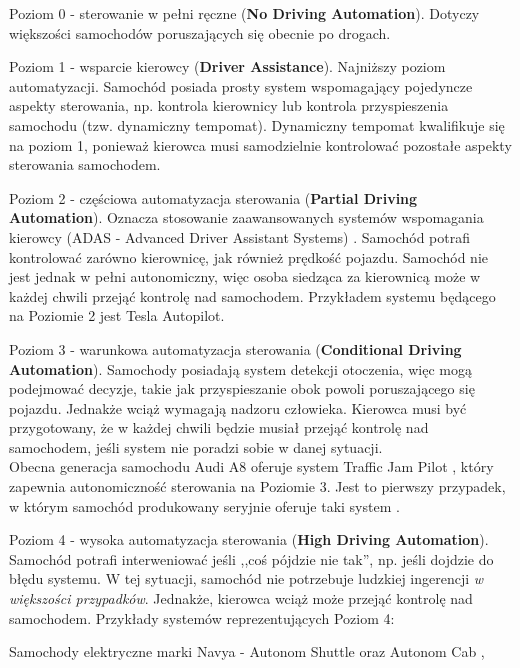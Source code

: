 \begin{enumerate*}
\item Poziom 0 - sterowanie w pełni ręczne (\textbf{No Driving Automation}). Dotyczy większości samochodów poruszających się obecnie po drogach.
\item Poziom 1 - wsparcie kierowcy (\textbf{Driver Assistance}). Najniższy poziom automatyzacji. Samochód posiada prosty system wspomagający pojedyncze aspekty sterowania, np. kontrola kierownicy lub kontrola przyspieszenia samochodu (tzw. dynamiczny tempomat). 
Dynamiczny tempomat kwalifikuje się na poziom 1, ponieważ kierowca musi samodzielnie kontrolować pozostałe aspekty sterowania samochodem.
\item Poziom 2 - częściowa automatyzacja sterowania (\textbf{Partial Driving Automation}). Oznacza stosowanie zaawansowanych systemów wspomagania kierowcy (ADAS - Advanced Driver Assistant Systems) \cite{adas:opis}. Samochód potrafi kontrolować zarówno kierownicę, jak również prędkość pojazdu. Samochód nie jest jednak w pełni autonomiczny, więc osoba siedząca za kierownicą może w każdej chwili przejąć kontrolę nad samochodem. Przykładem systemu będącego na Poziomie 2 jest Tesla Autopilot.
\item Poziom 3 - warunkowa automatyzacja sterowania (\textbf{Conditional Driving Automation}). Samochody posiadają system detekcji otoczenia, więc mogą podejmować decyzje, takie jak przyspieszanie obok powoli poruszającego się pojazdu. Jednakże wciąż wymagają nadzoru człowieka. Kierowca musi być przygotowany, że w każdej chwili będzie musiał przejąć kontrolę nad samochodem, jeśli system nie poradzi sobie w danej sytuacji. \\
Obecna generacja samochodu Audi A8 oferuje system Traffic Jam Pilot \cite{audi:trafficJamPilot}, który zapewnia autonomiczność sterowania na Poziomie 3. Jest to pierwszy przypadek, w którym samochód produkowany seryjnie oferuje taki system \cite{audi:newAudiA8ConditionalAutomated}.
\item Poziom 4 - wysoka automatyzacja sterowania (\textbf{High Driving Automation}). Samochód potrafi interweniować jeśli ,,coś pójdzie nie tak'', np. jeśli dojdzie do błędu systemu. W tej sytuacji, samochód nie potrzebuje ludzkiej ingerencji \textit{w większości przypadków}. Jednakże, kierowca wciąż może przejąć kontrolę nad samochodem. Przykłady systemów reprezentujących Poziom 4:
\begin{itemize*}
\item Samochody elektryczne marki Navya - Autonom Shuttle oraz Autonom Cab \cite{motorAuthority:navyaCars},

\end{itemize*}
\end{enumerate*}
